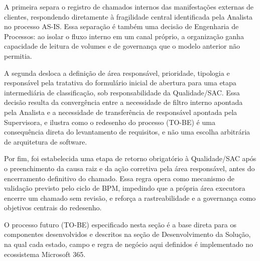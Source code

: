 A primeira separa o registro de chamados internos das
manifestações externas de clientes, respondendo diretamente à
fragilidade central identificada pela Analista no processo
AS-IS. Essa separação é também uma decisão de Engenharia de
Processos: ao isolar o fluxo interno em um canal próprio, a
organização ganha capacidade de leitura de volumes e de
governança que o modelo anterior não permitia.

A segunda desloca a definição de área responsável, prioridade,
tipologia e responsável pela tratativa do formulário inicial
de abertura para uma etapa intermediária de classificação,
sob responsabilidade da Qualidade/SAC. Essa decisão resulta da
convergência entre a necessidade de filtro interno apontada
pela Analista e a necessidade de transferência de responsável
apontada pela Supervisora, e ilustra como o redesenho do
processo (TO-BE) é uma consequência direta do levantamento de
requisitos, e não uma escolha arbitrária de arquitetura de
software.

Por fim, foi estabelecida uma etapa de retorno obrigatório à
Qualidade/SAC após o preenchimento da causa raiz e da ação
corretiva pela área responsável, antes do encerramento
definitivo do chamado. Essa regra opera como mecanismo de
validação previsto pelo ciclo de BPM, impedindo que a própria
área executora encerre um chamado sem revisão, e reforça a
rastreabilidade e a governança como objetivos centrais do
redesenho.

O processo futuro (TO-BE) especificado nesta seção é a base
direta para os componentes desenvolvidos e descritos na seção
de Desenvolvimento da Solução, na qual cada estado, campo e
regra de negócio aqui definidos é implementado no ecossistema
Microsoft 365.
